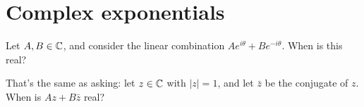 \begin{comment}  %
\end{comment}  %
\section{Complex exponentials}

Let $A, B \in \mathbb{C}$, and consider the linear combination $Ae^{i\theta} + Be^{-i\theta}$. When is this real?

That's the same as asking: let $z \in \mathbb{C}$ with $|z| = 1$, and let $\bar{z}$ be the conjugate of
$z$. When is $Az + B\bar{z}$ real?
\begin{comment}  %


\section{Complex functions}
\footnotetext{Notes based on Steven Wittens article \url{http://acko.net/blog/how-to-fold-a-julia-fractal/}}

Define
\begin{align*}
  \C   &= \{(r, \theta) ~|~ 0 \leq r < \infty, -\pi < \theta \leq \pi\} \\
  \C^* &= \{(r, \theta) ~|~ 0 \leq r < \infty, -\infty < \theta < \infty\}.
\end{align*}

Geometrically, we can think of $\C$ as a disc of infinite radius and $\C^*$ as a corkscrew-shaped
surface of infinite radius and infinite longitudinal extent.

There is a many-to-one map $\C^* \to \C$ given by
\begin{align*}
  (r, \theta) \mapsto (r, \theta\mod 2\pi).
\end{align*}

Geometrically, this map squashes the corkscrew into a plane (it is many-to-one and surjective). So
$z \in \C$ recurs on infinitely many ``sheets'' of the corkscrew.

Now consider the square root map $\C^* \to \C^*$ defined by
\begin{align*}
  \(r, \theta\) &\mapsto \(\sqrt{r}, \theta/2\).
\end{align*}

Geometrically, we can think of this as ``compressing'' the corkscrew longitudinally by a factor of
$1/2$, and distorting it radially by a square root transformation. This map is a bijection.

Now, how can we define a square root map $\C \to \C$? If we define this as
$\(r, \theta\) \mapsto \(\sqrt{r}, \theta/2\)$ then the image image is restricted to $-\pi/2 < \theta \leq \pi/2$, i.e. $f(\C)$ of the map is a half-plane.

\begin{align*}
  \(r, \theta\) &\mapsto \(\sqrt{r}, \theta/2\)
\end{align*}
then its . But
\begin{align*}
  (r, 2\pi) \mapsto (\sqrt{r}, \pi)
\end{align*}
\end{comment}  %
